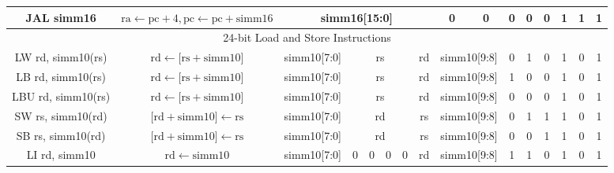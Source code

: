 \documentclass[a4paper,10pt]{article}
\begin{document}
\begin{landscape}
\begin{longtable}[c]{|c|c|@{}c@{}|@{}c@{}|@{}c@{}|@{}c@{}|@{}c@{}|@{}c@{}|@{}c@{}|@{}c@{}|@{}c@{}|@{}c@{}|@{}c@{}|@{}c@{}|@{}c@{}|@{}c@{}|@{}c@{}|@{}c@{}|@{}c@{}|@{}c@{}|@{}c@{}|@{}c@{}|@{}c@{}|@{}c@{}|@{}c@{}|@{}c@{}|}
JAL simm16            & $\mathrm{ra} \leftarrow \mathrm{pc} + 4, \mathrm{pc} \leftarrow \mathrm{pc} + \mathrm{simm16}$ & \multicolumn{16}{c|}{simm16{[}15:0{]}}                                                                                         & 0              & 0              & 0 & 0   & 0   & 1 & 1 & 1 \\

\hline
\multicolumn{26}{|c|}{24-bit Load and Store Instructions}                                                                                                                                                                                                                                                             \\\hline
LW rd, simm10(rs)     & $\mathrm{rd} \leftarrow {[}\mathrm{rs} + \mathrm{simm10}{]}$ & \multicolumn{8}{c|}{simm10{[}7:0{]}}                        & \multicolumn{4}{c|}{rs}             & \multicolumn{4}{c|}{rd}      & \multicolumn{2}{c|}{simm10{[}9:8{]}} & 0   & 1   & 0   & 1 & 0 & 1 \\
LB rd, simm10(rs)     & $\mathrm{rd} \leftarrow {[}\mathrm{rs} + \mathrm{simm10}{]}$ & \multicolumn{8}{c|}{simm10{[}7:0{]}}                        & \multicolumn{4}{c|}{rs}             & \multicolumn{4}{c|}{rd}      & \multicolumn{2}{c|}{simm10{[}9:8{]}} & 1   & 0   & 0   & 1 & 0 & 1 \\
LBU rd, simm10(rs)    & $\mathrm{rd} \leftarrow {[}\mathrm{rs} + \mathrm{simm10}{]}$ & \multicolumn{8}{c|}{simm10{[}7:0{]}}                        & \multicolumn{4}{c|}{rs}             & \multicolumn{4}{c|}{rd}      & \multicolumn{2}{c|}{simm10{[}9:8{]}} & 0   & 0   & 0   & 1 & 0 & 1 \\
SW rs, simm10(rd)     & ${[}\mathrm{rd} + \mathrm{simm10}{]} \leftarrow \mathrm{rs}$ & \multicolumn{8}{c|}{simm10{[}7:0{]}}                        & \multicolumn{4}{c|}{rd}             & \multicolumn{4}{c|}{rs}      & \multicolumn{2}{c|}{simm10{[}9:8{]}} & 0 & 1   & 1   & 1 & 0 & 1 \\
SB rs, simm10(rd)     & ${[}\mathrm{rd} + \mathrm{simm10}{]} \leftarrow \mathrm{rs}$ & \multicolumn{8}{c|}{simm10{[}7:0{]}}                        & \multicolumn{4}{c|}{rd}             & \multicolumn{4}{c|}{rs}      & \multicolumn{2}{c|}{simm10{[}9:8{]}} & 0   & 0   & 1   & 1 & 0 & 1 \\
LI rd, simm10         & $\mathrm{rd} \leftarrow \mathrm{simm10}$ & \multicolumn{8}{c|}{simm10{[}7:0{]}}                        & 0      & 0    & 0    & 0   & \multicolumn{4}{c|}{rd}      & \multicolumn{2}{c|}{simm10{[}9:8{]}} & 1   & 1   & 0   & 1 & 0 & 1 \\


\end{longtable}
\end{landscape}
\end{document}
